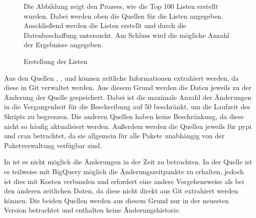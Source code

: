 \begin{figure}
    
    \caption{Erstellung der Listen}
    \label{fig:erstellung_listen}
    \small
    Die Abbildung zeigt den Prozess, wie die Top 100 Listen erstellt wurden. Dabei werden oben die Quellen für die Listen angegeben. Anschließend werden die Listen erstellt und durch die Datenbeschaffung untersucht. Am Schluss wird die mögliche Anzahl der Ergebnisse angegeben.
\end{figure}

Aus den Quellen , ,  und  können zeitliche Informationen extrahiert werden, da diese in Git verwaltet werden.
Aus diesem Grund werden die Daten jeweils zu der Änderung der Quelle gespeichert.
Dabei ist die maximale Anzahl der Änderungen in die Vergangenheit für die Beschreibung auf 50 beschränkt, um die Laufzeit des Skripts zu begrenzen.
Die anderen Quellen haben keine Beschränkung, da diese nicht so häufig aktualisiert werden.
Außerdem werden die Quellen jeweils für \gls{pypi} und \gls{cran} betrachtet, da sie allgemein für alle Pakete unabhängig von der Paketverwaltung verfügbar sind.

In  ist es nicht möglich die Änderungen in der Zeit zu betrachten.
In der  Quelle ist es teilweise mit BigQuery möglich die Änderungszeitpunkte zu erhalten, jedoch ist dies mit Kosten verbunden und erfordert eine andere Vorgehensweise als bei den anderen zeitlichen Daten, da diese nicht direkt aus Git extrahiert werden können.
Die beiden Quellen werden aus diesem Grund nur in der neuesten Version betrachtet und enthalten keine Änderungshistorie.







